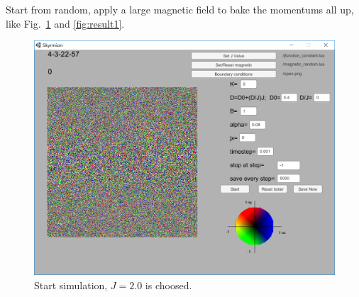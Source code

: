 \documentclass[aps,superscriptaddress,groupedaddress]{revtex4}  %
\begin{document}
Start from random, apply a large magnetic field to bake the momentums all up, like Fig.~\ref{Fig:start} and \ref{fig:result1}.
\begin{figure}
\includegraphics[scale=0.3]{start.png}
\caption{\label{Fig:start}Start simulation, $J=2.0$ is choosed.}
\end{figure}
\end{document}
